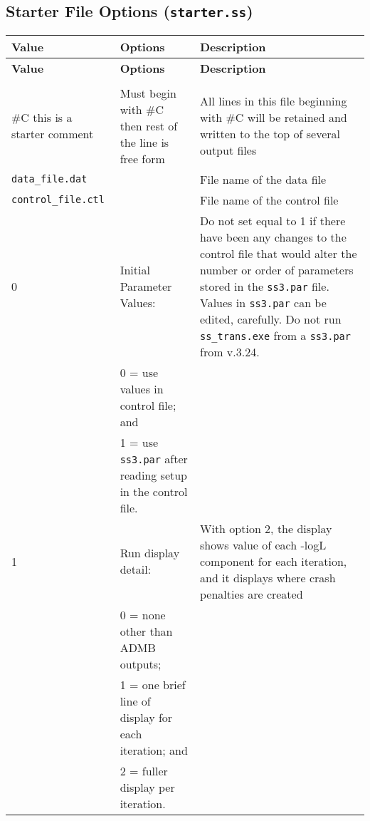 {
\setlength\extrarowheight{4pt}
\begin{landscape}
\subsection{Starter File Options (\texttt{starter.ss})}	

\begin{longtable}{p{1.5cm} p{7.2cm} p{12.3cm}} 

 \hline
 \textbf{Value} & \textbf{Options} & \textbf{Description} \TBstrut\\ 
 \hline
 \endfirsthead
 
 \hline
 \textbf{Value} & \textbf{Options} & \textbf{Description} \TBstrut\\ 
 \hline
 \endhead
 
 \hline
 \endfoot
 
 \hline
 \multicolumn{3}{c}{\textbf{End of Starter File}} \Tstrut\Bstrut\\
 \hline
 \endlastfoot

 \#C this is a starter comment & Must begin with \#C then rest of the line is free form & All lines in this file beginning with \#C will be retained and written to the top of several output files \Tstrut\\
		
 \hline
 \texttt{data\_file.dat} &  & File name of the data file \Tstrut\\
		
 \hline
 \texttt{control\_file.ctl} &  & File name of the control file \Tstrut\\
   
 \hline		
 0 & Initial Parameter Values: & \multirow{1}{1cm}[-0.25cm]{\parbox{12.5cm}{Do not set equal to 1 if there have been any changes to the control file that would alter the number or order of parameters stored in the \texttt{ss3.par} file. Values in \texttt{ss3.par} can be edited, carefully. Do not run \texttt{ss\_trans.exe} from a \texttt{ss3.par} from v.3.24.}}\Tstrut\\
 & 0 = use values in control file; and &  \\
 & 1 = use \texttt{ss3.par} after reading setup in the control file. & \\
		
 \hline
 1 & Run display detail: &  \multirow{1}{1cm}[-0.25cm]{\parbox{12.5cm}{With option 2, the display shows value of each -logL component for each iteration, and it displays where crash penalties are created}} \Tstrut\\
   & 0 = none other than ADMB outputs; & \\
   & 1 = one brief line of display for each iteration; and & \\
   & 2 = fuller display per iteration. & \\
		  

\end{longtable}
\end{landscape}}
